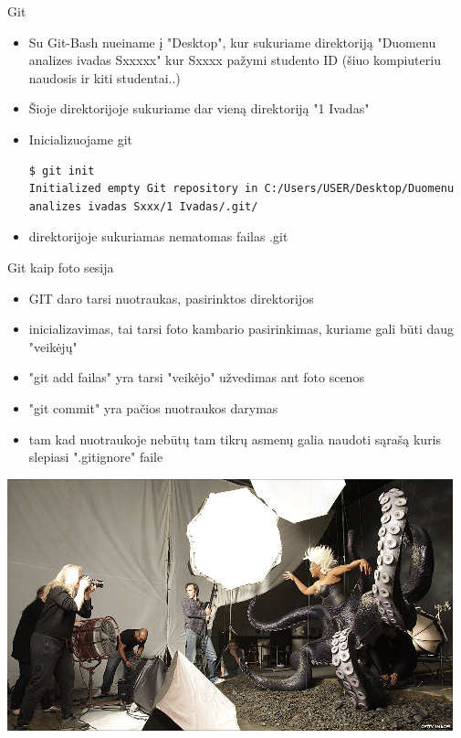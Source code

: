 \documentclass[11pt,xcolor=table]{beamer}
\begin{document}
\begin{frame}[fragile]{Git}
\begin{itemize}
\item Su Git-Bash nueiname į "Desktop", kur sukuriame direktoriją "Duomenu analizes ivadas Sxxxxx" kur Sxxxx pažymi studento ID (šiuo kompiuteriu naudosis ir kiti studentai..)
\item Šioje direktorijoje sukuriame dar vieną direktoriją "1 Ivadas"
\item Inicializuojame git
\begin{lstlisting}
$ git init
Initialized empty Git repository in C:/Users/USER/Desktop/Duomenu analizes ivadas Sxxx/1 Ivadas/.git/
\end{lstlisting}
\item direktorijoje sukuriamas nematomas failas .git
\end{itemize}
\end{frame}


\begin{frame}{Git kaip foto sesija}
\begin{itemize}
\item GIT daro tarsi nuotraukas, pasirinktos direktorijos
\item inicializavimas, tai tarsi foto kambario pasirinkimas, kuriame gali būti daug "veikėjų"
\item "git add failas" yra tarsi "veikėjo" užvedimas ant foto scenos
\item "git commit" yra pačios nuotraukos darymas
\item tam kad nuotraukoje nebūtų tam tikrų asmenų galia naudoti sąrašą kuris slepiasi ".gitignore" faile
\end{itemize}
\center
\includegraphics[scale=0.4]{photo_session.png}
\end{frame}
\end{document}
